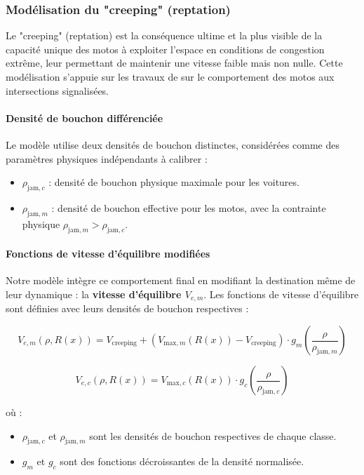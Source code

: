 \subsubsection{Modélisation du "creeping" (reptation)}
Le "creeping" (reptation) est la conséquence ultime et la plus visible de la capacité unique des motos à exploiter l'espace en conditions de congestion extrême, leur permettant de maintenir une vitesse faible mais non nulle. Cette modélisation s'appuie sur les travaux de \cite{Minh2006} sur le comportement des motos aux intersections signalisées.

\paragraph{Densité de bouchon différenciée}
Le modèle utilise deux densités de bouchon distinctes, considérées comme des paramètres physiques indépendants à calibrer :
\begin{itemize}
    \item $\rho_{\text{jam},c}$ : densité de bouchon physique maximale pour les voitures.
    \item $\rho_{\text{jam},m}$ : densité de bouchon effective pour les motos, avec la contrainte physique $\rho_{\text{jam},m} > \rho_{\text{jam},c}$.
\end{itemize}

\paragraph{Fonctions de vitesse d'équilibre modifiées}
Notre modèle intègre ce comportement final en modifiant la destination même de leur dynamique : la \textbf{vitesse d'équilibre $V_{e,m}$}. Les fonctions de vitesse d'équilibre sont définies avec leurs densités de bouchon respectives :

\begin{equation}
V_{e,m}(\rho, R(x)) = V_{\text{creeping}} + \left(V_{\text{max},m}(R(x)) - V_{\text{creeping}}\right) \cdot g_m\left(\frac{\rho}{\rho_{\text{jam},m}}\right)
\end{equation}

\begin{equation}
V_{e,c}(\rho, R(x)) = V_{\text{max},c}(R(x)) \cdot g_c\left(\frac{\rho}{\rho_{\text{jam},c}}\right)
\end{equation}

où :
\begin{itemize}
    \item $\rho_{\text{jam},c}$ et $\rho_{\text{jam},m}$ sont les densités de bouchon respectives de chaque classe.
    \item $g_m$ et $g_c$ sont des fonctions décroissantes de la densité normalisée.
\end{itemize}

